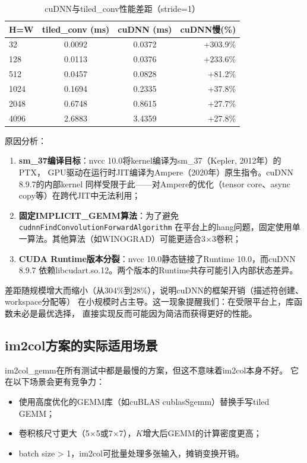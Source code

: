 \documentclass[UTF8,a4paper,12pt,fontset=none]{ctexart}
\begin{document}
\begin{table}[H]
  \centering
  \caption{cuDNN与tiled\_conv性能差距（stride=1）}
  \label{tab:cudnn_vs_tiled}
  \begin{tabular}{lccr}
    \toprule
    H=W & tiled\_conv (ms) & cuDNN (ms) & cuDNN慢(\%) \\
    \midrule
    32   & 0.0092 & 0.0372 & +303.9\% \\
    128  & 0.0113 & 0.0376 & +233.6\% \\
    512  & 0.0457 & 0.0828 & +81.2\% \\
    1024 & 0.1694 & 0.2335 & +37.8\% \\
    2048 & 0.6748 & 0.8615 & +27.7\% \\
    4096 & 2.6883 & 3.4359 & +27.8\% \\
    \bottomrule
  \end{tabular}
\end{table}

原因分析：

\begin{enumerate}
  \item \textbf{sm\_37编译目标}：nvcc 10.0将kernel编译为sm\_37（Kepler, 2012年）的PTX，
        GPU驱动在运行时JIT编译为Ampere（2020年）原生指令。cuDNN 8.9.7的内部kernel
        同样受限于此——对Ampere的优化（tensor core、async copy等）在跨代JIT中无法利用；
  \item \textbf{固定IMPLICIT\_GEMM算法}：为了避免\texttt{cudnnFindConvolutionForwardAlgorithm}
        在平台上的hang问题，固定使用单一算法。其他算法（如WINOGRAD）可能更适合3×3卷积；
  \item \textbf{CUDA Runtime版本分裂}：nvcc 10.0静态链接了Runtime 10.0，而cuDNN 8.9.7
        依赖libcudart.so.12。两个版本的Runtime共存可能引入内部状态差异。
\end{enumerate}

差距随规模增大而缩小（从304\%到28\%），说明cuDNN的框架开销（描述符创建、workspace分配等）
在小规模时占主导。这一现象提醒我们：在受限平台上，库函数未必是最优选择，
直接实现反而可能因为简洁而获得更好的性能。

\subsection{im2col方案的实际适用场景}

im2col\_gemm在所有测试中都是最慢的方案，但这不意味着im2col本身不好。
它在以下场景会更有竞争力：

\begin{itemize}
  \item 使用高度优化的GEMM库（如cuBLAS cublasSgemm）替换手写tiled GEMM；
  \item 卷积核尺寸更大（5×5或7×7），$K$增大后GEMM的计算密度更高；
  \item batch size > 1，im2col可批量处理多张输入，摊销变换开销。
\end{itemize}
\end{document}
